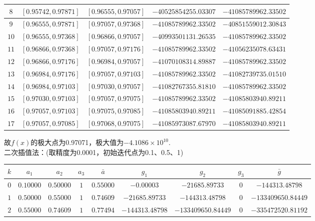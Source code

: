 \begin{enumerate}
\begin{table}[H]
\begin{tabular}{|c|c|c|c|c|}
            $8$ & $[0.95742,0.97871]$ & $[0.96555,0.97057]$ & $-40525854255.03307$ & $-41085789962.33502$\\ \hline
            $9$ & $[0.96555,0.97871]$ & $[0.97057,0.97368]$ & $-41085789962.33502$ & $-40851559012.30843$\\ \hline
            $10$ & $[0.96555,0.97368]$ & $[0.96866,0.97057]$ & $-40993501131.26535$ & $-41085789962.33502$\\ \hline
            $11$ & $[0.96866,0.97368]$ & $[0.97057,0.97176]$ & $-41085789962.33502$ & $-41056235078.63431$\\ \hline
            $12$ & $[0.96866,0.97176]$ & $[0.96984,0.97057]$ & $-41070108314.89887$ & $-41085789962.33502$\\ \hline
            $13$ & $[0.96984,0.97176]$ & $[0.97057,0.97103]$ & $-41085789962.33502$ & $-41082739735.01510$\\ \hline
            $14$ & $[0.96984,0.97103]$ & $[0.97030,0.97057]$ & $-41082767355.81810$ & $-41085789962.33502$\\ \hline
            $15$ & $[0.97030,0.97103]$ & $[0.97057,0.97075]$ & $-41085789962.33502$ & $-41085803940.89211$\\ \hline
            $16$ & $[0.97057,0.97103]$ & $[0.97075,0.97085]$ & $-41085803940.89211$ & $-41085091885.42854$\\ \hline
            $17$ & $[0.97057,0.97085]$ & $[0.97068,0.97075]$ & $-41085973087.67970$ & $-41085803940.89211$\\ \hline
        \end{tabular}
    \end{table}
    故$f(x)$的极大点为0.97071，极大值为$-4.1086\times10^{10}$.\\
    二次插值法：(取精度为0.0001，初始迭代点为0.1、0.5、1)
    {\small
    \begin{table}[H]
        \centering
        \begin{tabular}{|c|c|c|c|c|c|c|c|c|}
            \hline
            $k$ & $a_1$ & $a_2$ & $a_3$ & $\bar a$ & $g_1$ & $g_2$ & $g_3$ & $\bar g$ \\ \hline
            $0$ & $0.10000$ & $0.50000$ & $1$ & $0.55000$ & $-0.00003$ & $-21685.89733$ & $0$ & $-144313.48798$ \\ \hline
            $1$ & $0.50000$ & $0.55000$ & $1$ & $0.74609$ & $-21685.89733$ & $-144313.48798$ & $0$ & $-133409650.84449$ \\ \hline
            $2$ & $0.55000$ & $0.74609$ & $1$ & $0.77494$ & $-144313.48798$ & $-133409650.84449$ & $0$ & $-335472520.81192$ \\ \hline

\end{tabular}
\end{table}}
\end{enumerate}
